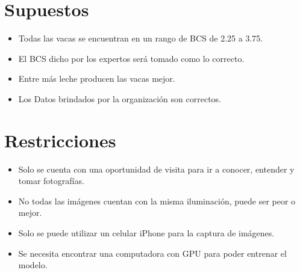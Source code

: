 \documentclass[11pt,letterpaper,DIV=12]{scrartcl}
\begin{document}
\section{Supuestos}

\begin{itemize}
  \item Todas las vacas se encuentran en un rango de BCS de 2.25 a 3.75.
  \item El BCS dicho por los expertos será tomado como lo correcto.
  \item Entre más leche producen las vacas mejor.
  \item Los Datos brindados por la organización son correctos.
\end{itemize}

\section{Restricciones}

\begin{itemize}
  \item Solo se cuenta con una oportunidad de visita para ir a conocer, entender y tomar fotografías.
  \item No todas las imágenes cuentan con la misma iluminación, puede ser peor o mejor.
  \item Solo se puede utilizar un celular iPhone para la captura de imágenes.
  \item Se necesita encontrar una computadora con GPU para poder entrenar el modelo.
\end{itemize}

\printbibliography
\end{document}
